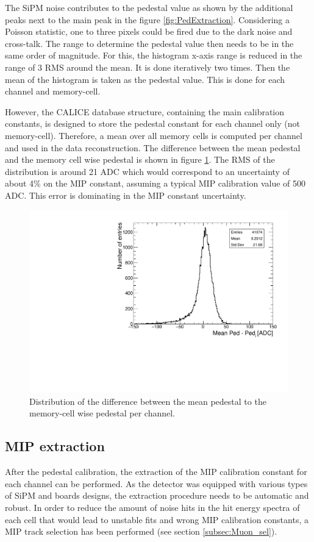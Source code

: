 The SiPM noise contributes to the pedestal value as shown by the additional peaks next to the main peak in the figure \ref{fig:PedExtraction}. Considering a Poisson statistic, one to three pixels could be fired due to the dark noise and cross-talk. The range to determine the pedestal value then needs to be in the same order of magnitude. For this, the histogram x-axis range is reduced in the range of 3 RMS around the mean. It is done iteratively two times. Then the mean of the histogram is taken as the pedestal value. This is done for each channel and memory-cell.

However, the CALICE database structure, containing the main calibration constants, is designed to store the pedestal constant for each channel only (not memory-cell). Therefore, a mean over all memory cells is computed per channel and used in the data reconstruction. The difference between the mean pedestal and the memory cell wise pedestal is shown in figure \ref{fig:CompMeanMem}. The RMS of the distribution is around 21 ADC which would correspond to an uncertainty of about 4\% on the MIP constant, assuming a typical MIP calibration value of 500 ADC. This error is dominating in the MIP constant uncertainty.

\begin{figure}[htbp!]
	\centering
	\includegraphics[width=0.6\linewidth]{../Thesis_Plots/EnergyCalib/Plots/ComparisonMeanPedtoMemorycell.pdf}
	\caption{Distribution of the difference between the mean pedestal to the memory-cell wise pedestal per channel.} \label{fig:CompMeanMem}
\end{figure}

\subsection{MIP extraction}
\label{sec:MIPExtraction}

After the pedestal calibration, the extraction of the MIP calibration constant for each channel can be performed. As the detector was equipped with various types of SiPM and boards designs, the extraction procedure needs to be automatic and robust. In order to reduce the amount of noise hits in the hit energy spectra of each cell that would lead to unstable fits and wrong MIP calibration constants, a MIP track selection has been performed (see section \ref{subsec:Muon_sel}).

